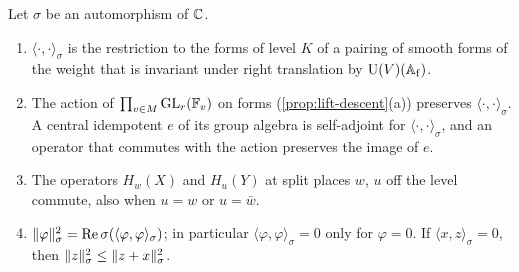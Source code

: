 \begin{lemma}\label{lem:hecke-adjoint}
Let $\sigma$ be an automorphism of $\mathbb{C}$.
\begin{enumerate}[label=\textup{(\alph*)}]
\item $\langle\cdot,\cdot\rangle_\sigma$ is the restriction to the forms of level $K$ of a pairing of smooth forms of the weight that is invariant under right translation by $\operatorname{U}(V)(\mathbb{A}_{\rm f})$.
\item The action of $\prod_{v\in M}\operatorname{GL}_r(\mathbb{F}_v)$ on forms (\cref{prop:lift-descent}(a)) preserves $\langle\cdot,\cdot\rangle_\sigma$. A central idempotent $e$ of its group algebra is self-adjoint for $\langle\cdot,\cdot\rangle_\sigma$, and an operator that
commutes with the action preserves the image of $e$.
\item The operators $H_w(X)$ and $H_u(Y)$ at split places $w$, $u$ off the level commute, also when $u=w$ or $u=\bar w$.
\item $\lVert \varphi\rVert_\sigma^2=\operatorname{Re}\sigma(\langle\varphi,\varphi\rangle_\sigma)$; in particular $\langle\varphi,\varphi\rangle_\sigma=0$ only for $\varphi=0$. If $\langle x,z\rangle_\sigma=0$, then $\lVert z\rVert_\sigma^2\le\lVert z+x\rVert_\sigma^2$.
\end{enumerate}
\end{lemma}

